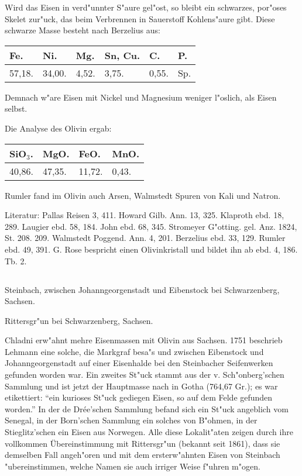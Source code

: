 \documentclass[a4paper, 11pt, oneside]{article}
\begin{document}
Wird das Eisen in verd"unnter S"aure gel"ost, so bleibt ein schwarzes, por"oses Skelet zur"uck, das beim Verbrennen in Sauerstoff Kohlens"aure gibt. Diese schwarze Masse besteht nach Berzelius aus:
\begin{table}[H]
    \centering\swabfamily\Large
    \begin{tabular}{l l l l l l}
        Fe. & Ni. & Mg. & Sn, Cu. & C. & P. \\ \hline
        57,18. & 34,00. & 4,52. & 3,75. & 0,55. & Sp. \\
    \end{tabular}
\end{table}

Demnach w"are Eisen mit Nickel und Magnesium weniger l"oslich, als Eisen selbst.

Die Analyse des Olivin ergab:
\begin{table}[H]
    \centering\swabfamily\Large
    \begin{tabular}{l l l l}
        SiO$_{3}$. & MgO. & FeO. & MnO. \\ \hline
        40,86. & 47,35. & 11,72. & 0,43. \\
    \end{tabular}
\end{table}

Rumler fand im Olivin auch Arsen, Walmstedt Spuren von Kali und Natron.

\normalsize
Literatur: Pallas Reisen 3, 411. Howard Gilb. Ann. 13, 325. Klaproth ebd. 18, 289. Laugier ebd. 58, 184. John ebd. 68, 345. Stromeyer G"otting. gel. Anz. 1824, St. 208. 209. Walmstedt Poggend. Ann. 4, 201. Berzelius ebd. 33, 129. Rumler ebd. 49, 391. G. Rose bespricht einen Olivinkristall und bildet ihn ab ebd. 4, 186. Tb. 2.

\subsection{}
\LARGE
\paragraph{}
Steinbach, zwischen Johanngeorgenstadt und Eibenstock bei Schwarzenberg, Sachsen.

Rittersgr"un bei Schwarzenberg, Sachsen.

Chladni erw"ahnt mehre Eisenmassen mit Olivin aus Sachsen. 1751 beschrieb Lehmann eine solche, die Markgraf besa"s und zwischen Eibenstock und Johanngeorgenstadt auf einer Eisenhalde bei den Steinbacher Seifenwerken gefunden worden war. Ein zweites St"uck stammt aus der v. Sch"onberg'schen Sammlung und ist jetzt der Hauptmasse nach in Gotha (764,67 Gr.); es war etikettiert: "`ein kurioses St"uck gediegen Eisen, so auf dem Felde gefunden worden."' In der de Drée'schen Sammlung befand sich ein St"uck angeblich vom Senegal, in der Born'schen Sammlung ein solches von B"ohmen, in der Stieglitz'schen ein Eisen aus Norwegen. Alle diese Lokalit"aten zeigen durch ihre vollkommen Übereinstimmung mit Rittersgr"un (bekannt seit 1861), dass sie demselben Fall angeh"oren und mit dem ersterw"ahnten Eisen von Steinbach "ubereinstimmen, welche Namen sie auch irriger Weise f"uhren m"ogen.
\end{document}
